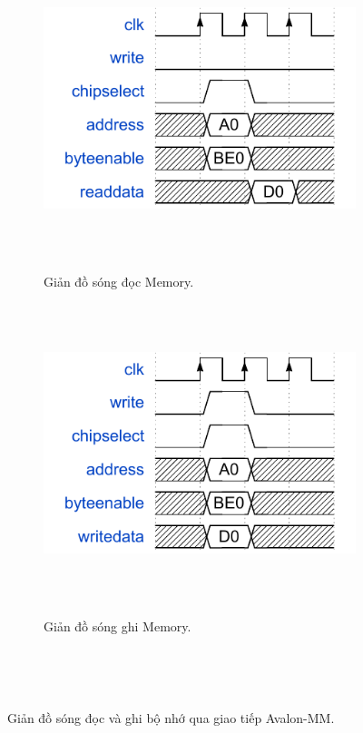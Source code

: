 \begin{figure}[htbp]
    \centering
    \begin{subfigure}[b]{0.48\textwidth}
        \centering
        \includegraphics[width=\linewidth]{Images/02_07_Memory_ReadWaveform.pdf}
        \caption{Giản đồ sóng đọc Memory.}
        \label{fig:02_07_memory_read_sub}
    \end{subfigure}
    \hfill
    \begin{subfigure}[b]{0.48\textwidth}
        \centering
        \includegraphics[width=\linewidth]{Images/02_08_Memory_WriteWaveform.pdf}
        \caption{Giản đồ sóng ghi Memory.}
        \label{fig:02_08_memory_write_sub}
    \end{subfigure}
    \caption{Giản đồ sóng đọc và ghi bộ nhớ qua giao tiếp Avalon-MM.}
    \label{fig:memory_waveforms}
\end{figure}

